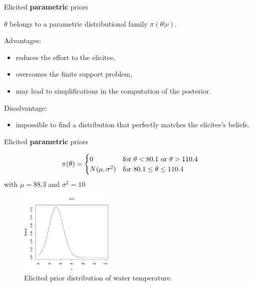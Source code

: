 \begin{frame}{Elicited \textbf{parametric} priors}

	$\theta$ belongs to a parametric distributional family $\pi(\theta|\nu)$.

	Advantages:
	\begin{itemize}
		\item reduces the effort to the elicitee,
		\item overcomes the finite support problem,
		\item may lead to simplifications in the computation of the posterior.
	\end{itemize}

	Disadvantage:
	\pause
	\begin{itemize}
		\item impossible to find a distribution that perfectly matches the elicitee's beliefs.
	\end{itemize}

\end{frame}

\begin{frame}{Elicited \textbf{parametric} priors}

	\begin{equation}
		\begin{displaystyle}
			\pi(\theta) = 
			\begin{cases}
				0 & \text{for } \theta < 80.1 \text{ or } \theta > 110.4 \\
				N(\mu,\sigma^2) & \text{for } 80.1 \leq \theta \leq 110.4     
			\end{cases}
		\end{displaystyle}
	\end{equation}
	with $\mu=88.3$ and $\sigma^2=10$

	\begin{figure}[!ht]
		\centering
		\includegraphics[width=4.5cm]{Figures/PriorLassen.png}
		\caption{Elicited prior distribution of water temperature.}
	\end{figure}

\end{frame}

